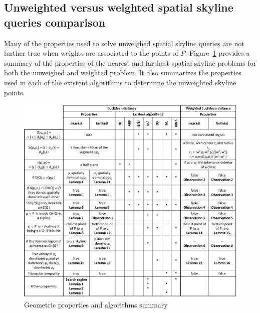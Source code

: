 \documentclass[11pt,onecolumn]{elsart3p}
\begin{document}
\subsection{Unweighted versus weighted spatial skyline queries comparison}

Many of the properties used to solve unweighed spatial skyline queries are not further true when weights are associated to the points of $P$. Figure~\ref{fig:propertiesSummary} provides a summary of the properties of the nearest and farthest spatial skyline problems for both the unweighed and weighted problem. It also summarizes the properties used in each of the existent algorithms to determine the unweighted skyline points.

        \begin{figure}[h]
        \begin{center}
        \includegraphics[width=\linewidth]{img/summary.eps}
        \caption{Geometric properties and algorithms summary }
        \label{fig:propertiesSummary}
        \end{center}
        \end{figure}
\end{document}
